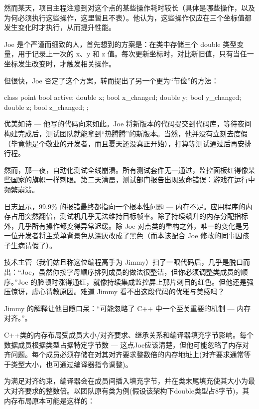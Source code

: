 然而某天，项目主程注意到对这个点的某些操作耗时较长（具体是哪些操作，以及为何必须执行这些操作，这里暂且不表）。他认为，这些操作仅应在三个坐标值都发生变化时才执行，从而提升性能。

Joe 是个严谨而细致的人，首先想到的方案是：在类中存储三个 double 类型变量，用于记录上一次的 x、y 和 z 值。每次更新坐标时，对比新旧值，只有当任一坐标发生改变时，才触发相关操作。

但很快，Joe 否定了这个方案，转而提出了另一个更为“节俭”的方法：

\begin{cpp}
class point {
  bool active;
  double x;
  bool x_changed;
  double y;
  bool y_changed;
  double z;
  bool z_changed;
};
\end{cpp}

优美如诗 --- 他写的代码向来如此。Joe 将新版本的代码提交到代码库，等待夜间构建完成后，测试团队就能拿到“热腾腾”的新版本。当然，他并没有立刻去度假（毕竟他是个敬业的开发者，而且夏天还没真正开始），打算等测试通过后再安排行程。

然而，那一夜，自动化测试全线崩溃。所有测试套件无一通过，监控面板红得像某些国家的旗帜一样刺眼。第二天清晨，测试部门报告出现致命错误：游戏在运行中频繁崩溃。

日志显示，99.9\% 的报错最终都指向一个根本性问题 --- 内存不足。应用程序的内存占用突然翻倍，测试机几乎无法维持目标帧率。除了持续飙升的内存分配指标外，几乎所有操作都变得异常迟缓。除 Joe 对点类的重构之外，唯一的变化是另一位开发者将主菜单背景色从深灰改成了黑色（而本该配合 Joe 修改的同事因孩子生病请假了）。

技术主管（我们姑且称这位编程高手为 Jimmy）扫了一眼代码后，几乎是脱口而出：“Joe，虽然你按字母顺序排列成员的做法很整洁，但你必须调整类成员的顺序。”Joe 的脸顿时涨得通红，就像持续集成监控屏上那片刺目的红色。但他还是强压惊讶，虚心请教原因。难道 Jimmy 看不出这段代码的优雅与美感吗？

Jimmy 的解释让他目瞪口呆：“可能忽略了 C++ 中一个至关重要的机制 --- 内存对齐。”。

C++类的内存布局受成员大小/对齐要求、继承关系和编译器填充字节影响。每个数据成员根据类型占据特定字节数 --- 这点Joe应该清楚，但他可能忽略了内存对齐问题。每个成员必须存储在对其对齐要求整数倍的内存地址上(对齐要求通常等于类型大小，也可通过编译器指令调整)。

为满足对齐约束，编译器会在成员间插入填充字节，并在类末尾填充使其大小为最大对齐要求的整数倍。以团队原有类为例(假设该架构下double类型占8字节)，其内存布局原本可能是这样的：


